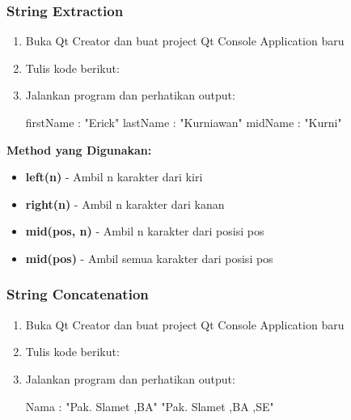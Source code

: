 \subsubsection{String Extraction}

\begin{enumerate}
\item Buka Qt Creator dan buat project Qt Console Application baru
\item Tulis kode berikut:



\item Jalankan program dan perhatikan output:

\begin{lcverbatim}
firstName :  "Erick"
lastName :  "Kurniawan"
midName :  "Kurni"
\end{lcverbatim}
\end{enumerate}

\textbf{Method yang Digunakan:}
\begin{itemize}
\item \textbf{left(n)} - Ambil n karakter dari kiri
\item \textbf{right(n)} - Ambil n karakter dari kanan
\item \textbf{mid(pos, n)} - Ambil n karakter dari posisi pos
\item \textbf{mid(pos)} - Ambil semua karakter dari posisi pos
\end{itemize}

\subsubsection{String Concatenation}

\begin{enumerate}
\item Buka Qt Creator dan buat project Qt Console Application baru
\item Tulis kode berikut:



\item Jalankan program dan perhatikan output:

\begin{lcverbatim}
Nama :  "Pak. Slamet ,BA"
"Pak. Slamet ,BA ,SE"
\end{lcverbatim}
\end{enumerate}

